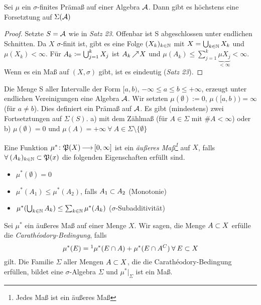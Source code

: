 \documentclass[skript.tex]{subfiles}
\begin{document}
	\begin{cor}
		Sei $\mu$ ein $\sigma$-finites Prämaß auf einer Algebra $\mathcal{A}$. Dann gibt es höchstens eine Forsetztung auf $\Sigma(\mathcal{A})$
	\end{cor}
	\begin{proof}
		Setzte $S=\mathcal{A}$ wie in \textit{Satz 23}. Offenbar ist S abgeschlossen unter endlichen Schnitten. Da $X$ $\sigma$-finit ist, gibt es eine Folge $(X_k)_{k\in\mathbb{N}}$ mit $X=\bigcup_{k\in\mathbb{N}}X_k$ und $\mu(X_k)<\infty$. Für $A_k\coloneqq\bigcup_{j=1}^{k}X_j$ ist $A_k \kern -1pt \nearrow \kern -2pt X$ und $\mu(A_k) \leq \sum_{j=1}^{k}\underbrace{\mu{X_j}}_{<\infty}<\infty$. Wenn es ein Maß auf $(X,\sigma)$ gibt, ist es eindeutig (\textit{Satz 23}).
	\end{proof}

	\begin{bsp}
		Die Menge S aller Intervalle der Form $[a,b)$, $-\infty\leq a \leq b \leq +\infty$, erzeugt unter endlichen Vereinigungen eine Algebra $\mathcal{A}$. Wir setzten $\mu(\emptyset):=0$, $\mu([a,b))=\infty$ (für $a\neq b$). Dies definiert ein Prämaß auf $\mathcal{A}$. Es gibt (mindestens) zwei Fortsetztungen auf $\Sigma(S)$. a) mit dem Zählmaß (für $A\in\Sigma$ mit $\#A<\infty$) oder b) $\mu(\emptyset)=0$ und $\mu(A)=+\infty \: \forall \: A\in\Sigma \setminus \{\emptyset\}$
	\end{bsp}

	\begin{defin}
		Eine Funktion $\mu^*\colon\mathfrak{P}(X)\kern -1pt \longrightarrow \kern -1pt[0,\infty]$ ist ein \textit{äußeres Maß\footnote{Jedes Maß ist ein äußeres Maß}} auf $X$, falls $\forall \: (A_k)_{k\in\mathbb{N}} \subset \mathfrak{P}(x)$ die folgenden Eigenschaften erfüllt sind.
		\begin{itemize}
			\item $\mu^*(\emptyset)=0$
			\item $\mu^*(A_1)\leq \mu^*(A_2)$, falls $A_1 \subset A_2$ (Monotonie)
			\item $\mu^*(\bigcup_{k\in\mathbb{N}}A_k)\leq \sum_{k\in\mathbb{N}}\mu^*(A_k)$ ($\sigma$-Subadditivität)
		\end{itemize}
	\end{defin}

	\begin{theorem}
		Sei $\mu^*$ ein äußeres Maß auf einer Menge $X$. Wir sagen, die Menge $A \subset X$ erfülle die \textit{Carathéodory-Bedingung}, falls
			\begin{equation*}
				\mu^*(E)=\footnotemark \mu^*(E \cap A) + \mu^*(E \cap A^C) \: \forall \: E \sbs X
			\end{equation*}
		gilt. Die Familie $\Sigma$ aller Mengen $A \subset X$, die die Carathéodory-Bedingung erfüllen, bildet eine $\sigma$-Algebra $\Sigma$ und $\mu^*|_\Sigma$ ist ein Maß.
	\end{theorem}
\end{document}

